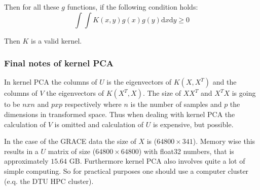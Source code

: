 Then for all these $g$ functions, if the following condition holds:
\begin{equation}
\int \int K(x, y) g(x) g(y) \mathrm{d}x \mathrm{d}y \ge 0
\end{equation}

Then $K$ is a valid kernel.

\subsubsection{Final notes of kernel PCA}

In kernel PCA the columns of $U$ is the eigenvectors of $K(X,X^T)$ and the columns of $V$ the eigenvectors of $K(X^T,X)$. The size of $X X^T$ and $X^T X$ is going to be $nxn$ and $pxp$ respectively where $n$ is the number of samples and $p$ the dimensions in transformed space. Thus when dealing with kernel PCA the calculation of $V$ is omitted and calculation of $U$ is expensive, but possible.

In the case of the GRACE data the size of $X$ is ($64800 \times 341$). Memory wise this results in a $U$ matrix of size ($64800 \times 64800$) with float32 numbers, that is approximately $15.64\text{ GB}$. Furthermore kernel PCA also involves quite a lot of simple computing. So for practical purposes one should use a computer cluster (e.q. the DTU HPC cluster).
